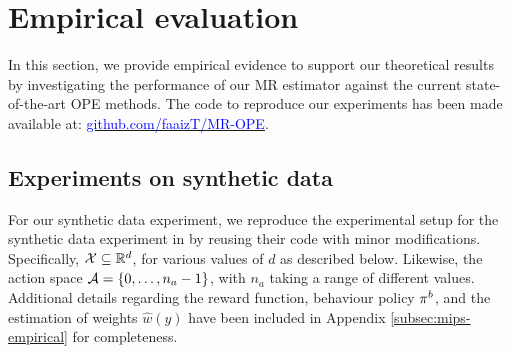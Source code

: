 \section{Empirical evaluation}
In this section, we provide empirical evidence to support our theoretical results by investigating the performance of our MR estimator against the current state-of-the-art OPE methods. The code to reproduce our experiments has been made available at: \href{https://github.com/faaizT/MR-OPE}{\textcolor{blue}{github.com/faaizT/MR-OPE}}.

\subsection{Experiments on synthetic data}\label{sec:exp-synth}
For our synthetic data experiment, we reproduce the experimental setup for the synthetic data experiment in \cite{saito2022off} by reusing their code with minor modifications.
Specifically, $\mathcal{X} \subseteq \mathbb{R}^d$, for various values of $d$ as described below. Likewise, the action space $\mathcal{A} = \{0, \dots, n_a-1\}$, with $n_a$ taking a range of different values. Additional details regarding the reward function, behaviour policy $\pi^b$, and the estimation of weights $\hat{w}(y)$ have been included in Appendix \ref{subsec:mips-empirical} for completeness. 



